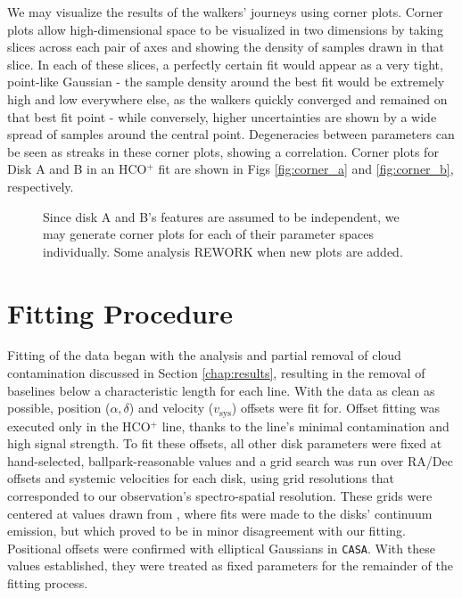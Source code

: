 We may visualize the results of the walkers' journeys using corner plots. Corner plots allow high-dimensional space to be visualized in two dimensions by taking slices across each pair of axes and showing the density of samples drawn in that slice. In each of these slices, a perfectly certain fit would appear as a very tight, point-like Gaussian - the sample density around the best fit would be extremely high and low everywhere else, as the walkers quickly converged and remained on that best fit point - while conversely, higher uncertainties are shown by a wide spread of samples around the central point. Degeneracies between parameters can be seen as streaks in these corner plots, showing a correlation. Corner plots for Disk A and B in an HCO$^+$ fit are shown in Figs \ref{fig:corner_a} and \ref{fig:corner_b}, respectively.


\begin{figure}[htp]
  \hspace*{\fill}%
  \hfill%
  \hspace*{\fill}%
  \caption{Since disk A and B's features are assumed to be independent, we may generate corner plots for each of their parameter spaces individually. Some analysis REWORK when new plots are added.}
  \label{fig:corner_plots}
\end{figure}





\section{Fitting Procedure}
\label{section:fitting_procedure}

Fitting of the data began with the analysis and partial removal of cloud contamination discussed in Section \ref{chap:results}, resulting in the removal of baselines below a characteristic length for each line. With the data as clean as possible, position ($\alpha, \delta$) and velocity ($v_\text{sys}$) offsets were fit for. Offset fitting was executed only in the HCO$^+$ line, thanks to the line's minimal contamination and high signal strength. To fit these offsets, all other disk parameters were fixed at hand-selected, ballpark-reasonable values and a grid search was run over RA/Dec offsets and systemic velocities for each disk, using grid resolutions that corresponded to our observation's spectro-spatial resolution. These grids were centered at values drawn from \cite{Williams2014}, where fits were made to the disks' continuum emission, but which proved to be in minor disagreement with our fitting. Positional offsets were confirmed with elliptical Gaussians in \texttt{CASA}. With these values established, they were treated as fixed parameters for the remainder of the fitting process.

